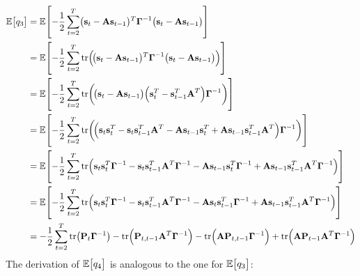 		\begin{align*}
			\E\bracket{q_3}
				&= \E\bracket{-\frac{1}{2} \sum_{t = 2}^{T} \paren{\vec{s}_t - \mat{A}\vec{s}_{t - 1}}^T \mat{\Gamma}^{-1} \paren{\vec{s}_t - \mat{A}\vec{s}_{t - 1}}} \\
				&= \E\bracket{-\frac{1}{2} \sum_{t = 2}^{T} \tr\paren{\!\paren{\vec{s}_t - \mat{A}\vec{s}_{t - 1}}^T \mat{\Gamma}^{-1} \paren{\vec{s}_t - \mat{A}\vec{s}_{t - 1}}}} \\
				&= \E\bracket{-\frac{1}{2} \sum_{t = 2}^{T} \tr\paren{\!\paren{\vec{s}_t - \mat{A}\vec{s}_{t - 1}} \paren{\vec{s}_t^T - \vec{s}_{t - 1}^T \mat{A}^T} \mat{\Gamma}^{-1}}} \\
				&= \E\bracket{-\frac{1}{2} \sum_{t = 2}^{T} \tr\paren{\!\paren{\vec{s}_t \vec{s}_t^T - \vec{s}_t \vec{s}_{t - 1}^T \mat{A}^T - \mat{A}\vec{s}_{t - 1} \vec{s}_t^T + \mat{A}\vec{s}_{t - 1} \vec{s}_{t - 1}^T \mat{A}^T} \mat{\Gamma}^{-1}}} \\
				&= \E\bracket{-\frac{1}{2} \sum_{t = 2}^{T} \tr\paren{\vec{s}_t \vec{s}_t^T \mat{\Gamma}^{-1} - \vec{s}_t \vec{s}_{t - 1}^T \mat{A}^T \mat{\Gamma}^{-1} - \mat{A}\vec{s}_{t - 1} \vec{s}_t^T \mat{\Gamma}^{-1} + \mat{A}\vec{s}_{t - 1} \vec{s}_{t - 1}^T \mat{A}^T \mat{\Gamma}^{-1}}} \\
				&= \E\bracket{-\frac{1}{2} \sum_{t = 2}^{T} \tr\paren{\vec{s}_t \vec{s}_t^T \mat{\Gamma}^{-1} - \vec{s}_t \vec{s}_{t - 1}^T \mat{A}^T \mat{\Gamma}^{-1} - \mat{A} \vec{s}_t \vec{s}_{t - 1}^T \mat{\Gamma}^{-1} + \mat{A}\vec{s}_{t - 1} \vec{s}_{t - 1}^T \mat{A}^T \mat{\Gamma}^{-1}}} \\
				&= -\frac{1}{2} \sum_{t = 2}^{T} \tr\paren{\mat{P}_t \mat{\Gamma}^{-1}} - \tr\paren{\mat{P}_{t, t - 1} \mat{A}^T \mat{\Gamma}^{-1}} - \tr\paren{\mat{A} \mat{P}_{t, t - 1} \mat{\Gamma}^{-1}} + \tr\paren{\mat{A} \mat{P}_{t - 1} \mat{A}^T \mat{\Gamma}^{-1}} \\
		\end{align*}
		The derivation of \( \mathbb{E}\mathopen{}\left[ {q_4}_{{}_{}}\,\negthickspace\right]\mathclose{} \) is analogous to the one for \( \mathbb{E}\mathopen{}\left[ {q_3}_{{}_{}}\,\negthickspace\right]\mathclose{} \):
